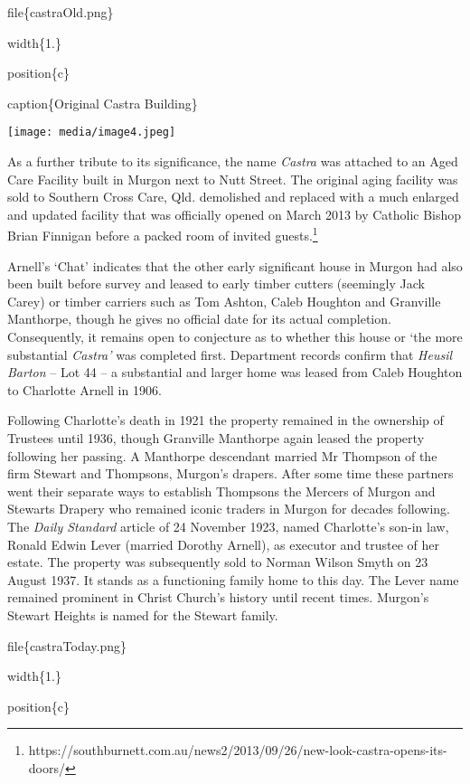 file\{castraOld.png\}

width\{1.\}

position\{c\}

caption\{Original Castra Building\}

\texttt{[image: media/image4.jpeg]}

As a further tribute to its significance, the name \emph{Castra} was attached to an Aged Care Facility built in Murgon next to Nutt Street. The original aging facility was sold to Southern Cross Care, Qld. demolished and replaced with a much enlarged and updated facility that was officially opened on March 2013 by Catholic Bishop Brian Finnigan before a packed room of invited guests.\footnote{https://southburnett.com.au/news2/2013/09/26/new-look-castra-opens-its-doors/}

Arnell's `Chat' indicates that the other early significant house in Murgon had also been built before survey and leased to early timber cutters (seemingly Jack Carey) or timber carriers such as Tom Ashton, Caleb Houghton and Granville Manthorpe, though he gives no official date for its actual completion. Consequently, it remains open to conjecture as to whether this house or `the more substantial \emph{Castra'} was completed first. Department records confirm that \emph{Heusil Barton} -- Lot 44 -- a substantial and larger home was leased from Caleb Houghton to Charlotte Arnell in 1906.

Following Charlotte's death in 1921 the property remained in the ownership of Trustees until 1936, though Granville Manthorpe again leased the property following her passing. A Manthorpe descendant married Mr Thompson of the firm Stewart and Thompsons, Murgon's drapers. After some time these partners went their separate ways to establish Thompsons the Mercers of Murgon and Stewarts Drapery who remained iconic traders in Murgon for decades following. The \emph{Daily Standard} article of 24 November 1923, named Charlotte's son-in law, Ronald Edwin Lever (married Dorothy Arnell), as executor and trustee of her estate. The property was subsequently sold to Norman Wilson Smyth on 23 August 1937. It stands as a functioning family home to this day. The Lever name remained prominent in Christ Church's history until recent times. Murgon's Stewart Heights is named for the Stewart family.

file\{castraToday.png\}

width\{1.\}

position\{c\}

